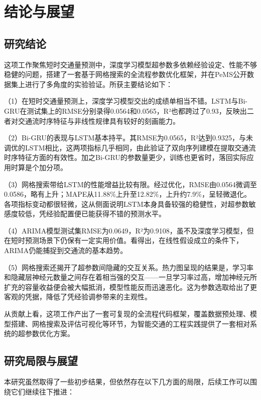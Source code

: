 \documentclass[12pt,a4paper,oneside]{ctexbook}
\begin{document}
	\chapter{结论与展望}
	
	\section{研究结论}
	
	这项工作聚焦短时交通量预测中，深度学习模型超参数多依赖经验设定、性能不够稳健的问题，搭建了一套基于网格搜索的全流程参数优化框架，并在PeMS公开数据集上进行了多角度的实验验证。所获主要结论如下：
	
	（1）在短时交通量预测上，深度学习模型交出的成绩单相当不错。LSTM与Bi-GRU在测试集上的RMSE分别录得0.0564和0.0565，R²也都跨过了0.93，反映出二者对交通流时序特征与非线性规律具有较好的刻画能力。
	
	（2）Bi-GRU的表现与LSTM基本持平。其RMSE为0.0565，R²达到0.9325，与未调优的LSTM相比，这两项指标几乎相同，由此验证了双向序列建模在提取交通流时序特征方面的有效性。加之Bi-GRU的参数量更少，训练也更省时，落回实际应用时算是个加分项。
	
	（3）网格搜索带给LSTM的性能增益比较有限。经过优化，RMSE由0.0564微调至0.0586，略有上升；MAPE从11.88\%上升至12.82\%，上升约7.9\%，呈轻微退化。各项指标变动都很轻微，这从侧面说明LSTM本身具备较强的稳健性，对超参数敏感度较低，凭经验配置便已能获得不错的预测水平。
	
	（4）ARIMA模型测试集RMSE为0.0649，R²为0.9108，虽不及深度学习模型，但在短时预测场景下仍保有一定实用价值。看得出，在线性假设成立的条件下，ARIMA仍能捕捉到交通流的基本趋势。
	
	（5）网格搜索还揭开了超参数间隐藏的交互关系。热力图呈现的结果是，学习率和隐藏层神经元数量之间存在着相当强的交互——一旦学习率过高，增加神经元所扩充的容量收益便会被大幅抵消，模型性能反而迅速恶化。这为参数选取给出了更客观的凭据，降低了凭经验调参带来的主观性。
	
	从贡献上看，这项工作产出了一套可复现的全流程代码框架，覆盖数据预处理、模型搭建、网格搜索及评估可视化等环节，为智能交通的工程实践提供了一套相对系统的超参数优化方案。
	
	\section{研究局限与展望}
	
	本研究虽然取得了一些初步结果，但依然存在以下几方面的局限，后续工作可以围绕它们继续往下推进：
	
\end{document}
